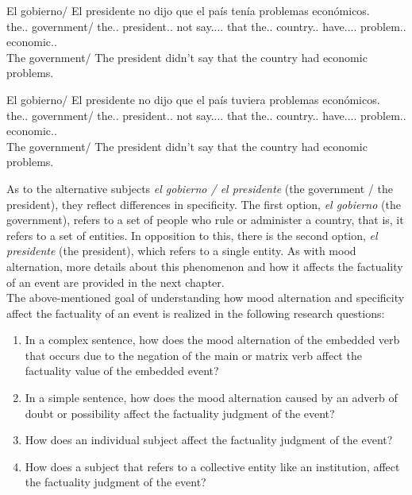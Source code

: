 \begin{exe}
  \ex
    \begin{xlist}
      \item{\gll El gobierno/ El presidente no dijo que el país tenía problemas económicos.\\ the.\M.\Sg{} government/ the.\M.\Sg{} president.\M.\Sg{} not say.\Pst.\Pfv.\Ind.\Tsg{} that the.\M.\Sg{} country.\F.\Sg{} have.\Pst.\Ipfv.\Ind.\Tsg{} problem.\M.\Pl{} economic.\M.\Pl{} \\\glt The government/ The president didn't say that the country had economic problems.}\label{ex:cond1}
      \item{\gll El gobierno/ El presidente no dijo que el país tuviera problemas económicos.\\ the.\M.\Sg{} government/ the.\M.\Sg{} president.\M.\Sg{} not say.\Pst.\Pfv.\Ind.\Tsg{} that the.\M.\Sg{} country.\F.\Sg{} have.\Pst.\Ipfv.\Sbjv.\Tsg{} problem.\M.\Pl{} economic.\M.\Pl{} \\\glt The government/ The president didn't say that the country had economic problems.}\label{ex:cond2}
    \end{xlist}
\end{exe}

As to the alternative subjects \textit{el gobierno / el presidente} (the government / the president), they reflect differences in specificity. The first option, \textit{el gobierno} (the government), refers to a set of people who rule or administer a country, that is, it refers to a set of entities. In opposition to this, there is the second option, \textit{el presidente} (the president), which refers to a single entity. As with mood alternation, more details about this phenomenon and how it affects the factuality of an event are provided in the next chapter.\\

The above-mentioned goal of understanding how mood alternation and specificity affect the factuality of an event is realized in the following research questions:\\  

\begin{enumerate}[RQ1.-]
        \item In a complex sentence, how does the mood alternation of the embedded verb that occurs due to the negation of the main or matrix verb affect the factuality value of the embedded event?
        \item In a simple sentence, how does the mood alternation caused by an adverb of doubt or possibility affect the factuality judgment of the event?\label{item:rq2}
        \item How does an individual subject affect the factuality judgment of the event?
        \item How does a subject that refers to a collective entity like an institution, affect the factuality judgment of the event?\label{item:rq4}
\end{enumerate}

